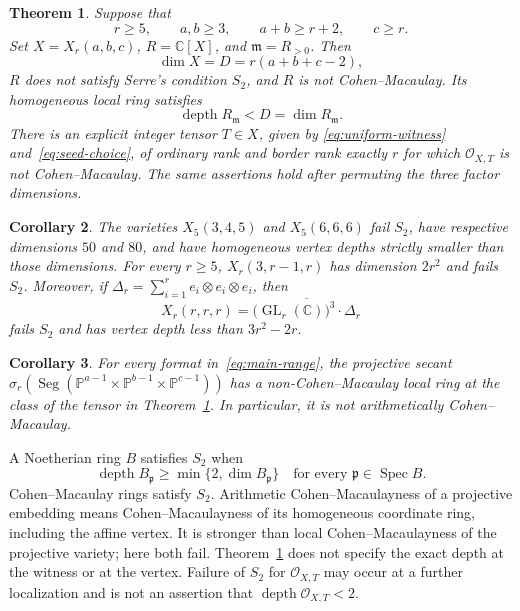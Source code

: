\documentclass[10pt,a4paper]{article}
\newtheorem{theorem}{Theorem}[section]
\newtheorem{corollary}[theorem]{Corollary}
\theoremstyle{definition}
\theoremstyle{remark}
\numberwithin{equation}{section}
\newcommand{\C}{\mathbb C}
\newcommand{\PP}{\mathbb P}
\newcommand{\OO}{\mathcal O}
\DeclareMathOperator{\Spec}{Spec}
\DeclareMathOperator{\depth}{depth}
\DeclareMathOperator{\GL}{GL}
\DeclareMathOperator{\Seg}{Seg}
\begin{document}
\begin{theorem}\label{thm:main}
Suppose that
\begin{equation}\label{eq:main-range}
 r\geq5,\qquad a,b\geq3,\qquad a+b\geq r+2,\qquad c\geq r.
\end{equation}
Set $X=X_r(a,b,c)$, $R=\C[X]$, and $\mathfrak m=R_{>0}$.
Then
\[
 \dim X=D=r(a+b+c-2),
\]
$R$ does not satisfy Serre's condition $S_2$, and $R$ is not
Cohen--Macaulay. Its homogeneous local ring satisfies
\begin{equation}\label{eq:main-depth}
 \depth R_{\mathfrak m}<D=\dim R_{\mathfrak m}.
\end{equation}
There is an explicit integer tensor $T\in X$, given by
\eqref{eq:uniform-witness} and~\eqref{eq:seed-choice}, of ordinary
rank and border rank exactly $r$ for which $\OO_{X,T}$ is not
Cohen--Macaulay. The same assertions hold after permuting the three
factor dimensions.
\end{theorem}

\begin{corollary}\label{cor:examples}
The varieties $X_5(3,4,5)$ and $X_5(6,6,6)$ fail $S_2$, have
respective dimensions $50$ and $80$, and have homogeneous vertex
depths strictly smaller than those dimensions. For every $r\geq5$,
$X_r(3,r-1,r)$ has dimension $2r^2$ and fails $S_2$.
Moreover, if $\Delta_r=\sum_{i=1}^r e_i\otimes e_i\otimes e_i$, then
\begin{equation}\label{eq:unit-orbit}
 X_r(r,r,r)=\overline{\bigl(\GL_r(\C)\bigr)^3\cdot\Delta_r}
\end{equation}
fails $S_2$ and has vertex depth less than $3r^2-2r$.
\end{corollary}

\begin{corollary}\label{cor:projective}
For every format in~\eqref{eq:main-range}, the projective secant
$\sigma_r(\Seg(\PP^{a-1}\times\PP^{b-1}\times\PP^{c-1}))$ has a
non-Cohen--Macaulay local ring at the class of the tensor in
Theorem~\ref{thm:main}. In particular, it is not arithmetically
Cohen--Macaulay.
\end{corollary}

A Noetherian ring $B$ satisfies $S_2$ when
\[
 \depth B_{\mathfrak p}\geq\min\{2,\dim B_{\mathfrak p}\}
 \quad\text{for every }\mathfrak p\in\Spec B.
\]
Cohen--Macaulay rings satisfy $S_2$. Arithmetic Cohen--Macaulayness of
a projective embedding means Cohen--Macaulayness of its homogeneous
coordinate ring, including the affine vertex. It is stronger than
local Cohen--Macaulayness of the projective variety; here both fail.
Theorem~\ref{thm:main} does not specify the exact depth at the witness
or at the vertex. Failure of $S_2$ for $\OO_{X,T}$ may occur at a
further localization and is not an assertion that
$\depth\OO_{X,T}<2$.
\end{document}
